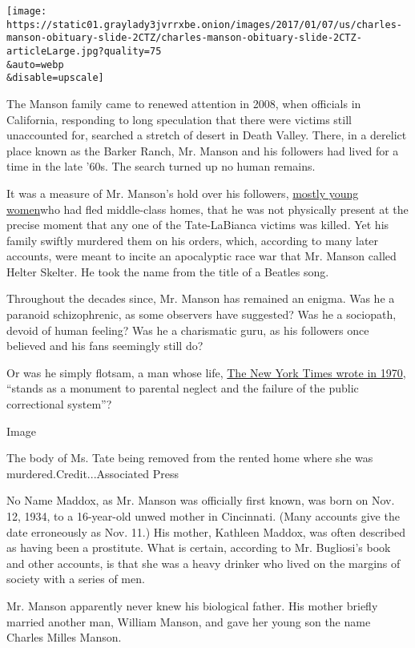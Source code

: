 \texttt{[image: https://static01.graylady3jvrrxbe.onion/images/2017/01/07/us/charles-manson-obituary-slide-2CTZ/charles-manson-obituary-slide-2CTZ-articleLarge.jpg?quality=75\\\&auto=webp\\\&disable=upscale]}

The Manson family came to renewed attention in 2008, when officials in
California, responding to long speculation that there were victims still
unaccounted for, searched a stretch of desert in Death Valley. There, in
a derelict place known as the Barker Ranch, Mr. Manson and his followers
had lived for a time in the late '60s. The search turned up no human
remains.

It was a measure of Mr. Manson's hold over his followers,
\href{https://www.nytimes3xbfgragh.onion/2017/11/20/us/what-ever-happened-to-the-manson-family.html}{mostly
young women}who had fled middle-class homes, that he was not physically
present at the precise moment that any one of the Tate-LaBianca victims
was killed. Yet his family swiftly murdered them on his orders, which,
according to many later accounts, were meant to incite an apocalyptic
race war that Mr. Manson called Helter Skelter. He took the name from
the title of a Beatles song.

Throughout the decades since, Mr. Manson has remained an enigma. Was he
a paranoid schizophrenic, as some observers have suggested? Was he a
sociopath, devoid of human feeling? Was he a charismatic guru, as his
followers once believed and his fans seemingly still do?

Or was he simply flotsam, a man whose life,
\href{http://www.nytimes3xbfgragh.onion/1970/01/04/archives/charlie-manson-one-mans-family-charlie-manson-one-mans-family.html}{The
New York Times wrote in 1970}, ``stands as a monument to parental
neglect and the failure of the public correctional system''?

Image

The body of Ms. Tate being removed from the rented home where she was
murdered.Credit...Associated Press

No Name Maddox, as Mr. Manson was officially first known, was born on
Nov. 12, 1934, to a 16-year-old unwed mother in Cincinnati. (Many
accounts give the date erroneously as Nov. 11.) His mother, Kathleen
Maddox, was often described as having been a prostitute. What is
certain, according to Mr. Bugliosi's book and other accounts, is that
she was a heavy drinker who lived on the margins of society with a
series of men.

Mr. Manson apparently never knew his biological father. His mother
briefly married another man, William Manson, and gave her young son the
name Charles Milles Manson.

